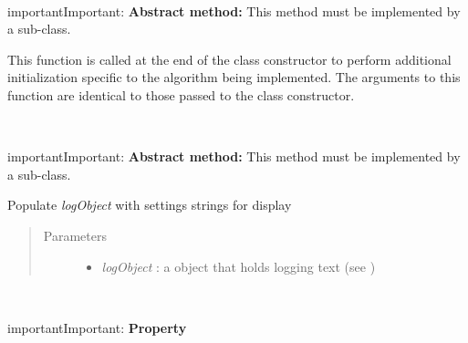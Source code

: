 \documentclass[letterpaper,10pt,english]{sphinxmanual}
\begin{document}
\begin{fulllineitems}
\begin{fulllineitems}
\label{api-doc/mosaic.meta:mosaic.metaTrajIO.metaTrajIO._init}~
\begin{notice}{important}{Important:}
\textbf{Abstract method:} This method must be implemented by a sub-class.
\end{notice}

This function is called at the end of the class constructor to perform additional initialization specific to the algorithm being implemented. The arguments to this function are identical to those passed to the class constructor.

\end{fulllineitems}


\begin{fulllineitems}
\label{api-doc/mosaic.meta:mosaic.metaTrajIO.metaTrajIO._formatsettings}~
\begin{notice}{important}{Important:}
\textbf{Abstract method:} This method must be implemented by a sub-class.
\end{notice}

Populate \emph{logObject} with settings strings for display
\begin{quote}\begin{description}
\item[{Parameters}] \leavevmode\begin{itemize}
\item {} 
\emph{logObject} :         a object that holds logging text (see {\hyperref[api\string-doc/mosaic.misc:mosaic.utilities.mosaicLog.mosaicLog]{\emph{}}})

\end{itemize}

\end{description}\end{quote}

\end{fulllineitems}


\begin{fulllineitems}
\label{api-doc/mosaic.meta:mosaic.metaTrajIO.metaTrajIO.DataLengthSec}~
\begin{notice}{important}{Important:}
\textbf{Property}
\end{notice}


\end{fulllineitems}
\end{fulllineitems}
\end{document}
